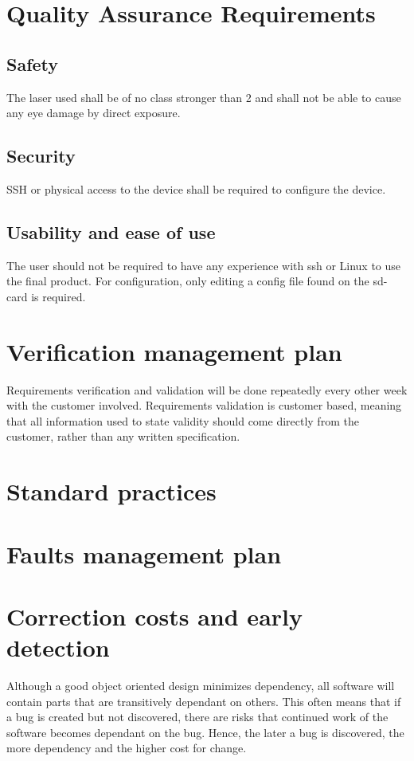 \documentclass{article}
\begin{document}
\section{Quality Assurance Requirements}
\subsection{Safety}
The laser used shall be of no class stronger than 2 and shall not be able to cause any eye damage by direct exposure.
\subsection{Security}
SSH or physical access to the device shall be required to configure the device.
\subsection{Usability and ease of use}
The user should not be required to have any experience with ssh or Linux to use the final product.
For configuration, only editing a config file found on the sd-card is required.

\section{Verification management plan}
Requirements verification and validation will be done repeatedly every other week with the customer involved.
Requirements validation is customer based, meaning that all information used to state validity should come directly from the customer, rather than any written specification.

\section{Standard practices}
\section{Faults management plan}
\section{Correction costs and early detection}
Although a good object oriented design minimizes dependency, all software will contain parts that are transitively dependant on others.
This often means that if a bug is created but not discovered, there are risks that continued work of the software becomes dependant on the bug.
Hence, the later a bug is discovered, the more dependency and the higher cost for change.
\end{document}
